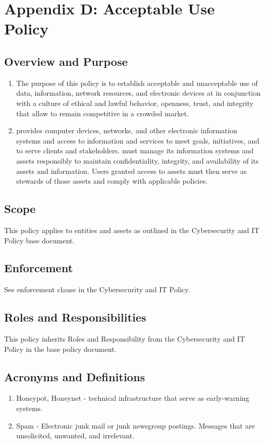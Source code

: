 \documentclass[../main.tex]{subfiles}
\begin{document}
\section{Appendix D: Acceptable Use Policy}
\subsection{Overview and Purpose}
\begin{enumerate}
    \item The purpose of this policy is to establish acceptable and unacceptable use of data, information, network resources, and electronic devices at \CompanyName{} in conjunction
    with a culture of ethical and lawful behavior, openness, trust, and integrity that allow \CompanyName{} to remain competitive in a crowded market.
    \item \CompanyName{} provides computer devices, networks, and other electronic information systems and access to information and services to meet \CompanyName{} goals, initiatives,
    and to serve clients and stakeholders. \CompanyName{} must manage its information systems and assets responsibly to maintain confidentiality, integrity, and availability of its assets
    and information. Users granted access to \CompanyName{} assets must then serve as stewards of those assets and comply with applicable policies.
\end{enumerate}
\subsection{Scope}
This policy applies to entities and assets as outlined in the Cybersecurity and IT Policy base document.
\subsection{Enforcement}
See enforcement clause in the Cybersecurity and IT Policy.
\subsection{Roles and Responsibilities}
This policy inherits Roles and Responsibility from the Cybersecurity and IT Policy in the base policy document.
\subsection{Acronyms and Definitions}
\begin{enumerate}
    \item Honeypot, Honeynet - technical infrastructure that serve as early-warning systems.
    \item Spam - Electronic junk mail or junk newsgroup postings. Messages that are unsolicited, unwanted, and irrelevant.
\end{enumerate}
\end{document}
